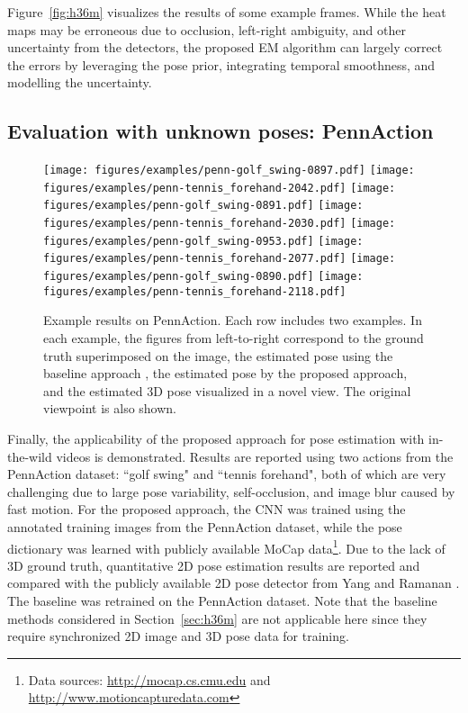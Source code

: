 \documentclass[10pt,twocolumn,letterpaper]{article}
\newcommand{\refFig}[1]{Figure~\ref{#1}}
\newcommand{\refSec}[1]{Section~\ref{#1}}
\begin{document}
{\refFig{fig:h36m} visualizes the results of some example frames. While the heat maps may be erroneous due to occlusion, left-right ambiguity, and other uncertainty from the detectors, the proposed EM algorithm can largely correct the errors by leveraging the pose prior, integrating temporal smoothness, and modelling the uncertainty.

\subsection{Evaluation with unknown poses: PennAction}


\begin{figure*}
  \centering
\texttt{[image: figures/examples/penn-golf\_swing-0897.pdf]}\hspace{2em}
  \texttt{[image: figures/examples/penn-tennis\_forehand-2042.pdf]}
  \texttt{[image: figures/examples/penn-golf\_swing-0891.pdf]}\hspace{2em}
  \texttt{[image: figures/examples/penn-tennis\_forehand-2030.pdf]}
  \texttt{[image: figures/examples/penn-golf\_swing-0953.pdf]}\hspace{2em}
  \texttt{[image: figures/examples/penn-tennis\_forehand-2077.pdf]}
  \texttt{[image: figures/examples/penn-golf\_swing-0890.pdf]}\hspace{2em}
  \texttt{[image: figures/examples/penn-tennis\_forehand-2118.pdf]}
  \caption{Example results on PennAction. Each row includes two examples. In each example, the figures from left-to-right correspond to the ground truth superimposed on the image, the estimated pose using the baseline approach \cite{yang2011articulated}, the estimated pose by the proposed approach, and the estimated 3D pose visualized in a novel view. The original viewpoint is also shown. }\label{fig:penn}
\end{figure*}

Finally, the applicability of the proposed approach for pose estimation with in-the-wild videos is demonstrated. Results are reported using two actions from the PennAction dataset:
``golf swing" and ``tennis forehand", both of which are very challenging due to large pose variability, self-occlusion, and image blur caused by fast motion.
For the proposed approach, the CNN was trained using the annotated training images from the PennAction dataset, while the pose dictionary was learned with publicly available MoCap data\footnote{Data sources: \url{http://mocap.cs.cmu.edu} and \url{http://www.motioncapturedata.com}}. Due to the lack of 3D ground truth, quantitative 2D pose estimation results are reported and compared with the publicly available 2D pose detector from Yang and Ramanan \cite{yang2011articulated}.  The baseline was retrained on the PennAction dataset. Note that the baseline methods considered in \refSec{sec:h36m} are not applicable here since they require synchronized 2D image and 3D pose data for training.

}
\end{document}
